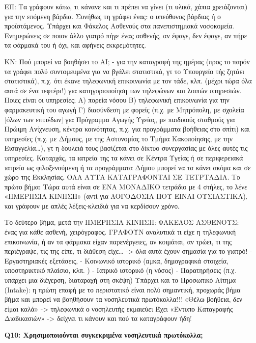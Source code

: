 ΕΠ: Τα γράφουν κάτω, τι κάνανε και τι πρέπει να γίνει (τι υλικά, χάπια χρειάζονται) για την επόμενη βάρδια. Συνήθως τη γράφει ένας: ο υπεύθυνος βάρδιας ή ο προϊστάμενος.
Υπάρχει και Φάκελος Ασθενούς στα πανεπιστημιακά νοσοκομεία.
Ενημερώνεις σε ποιον άλλο γιατρό πήγε ένας ασθενής, αν έφαγε, δεν έφαγε, αν πήρε τα φάρμακά του ή όχι, και αφήνεις εκκρεμότητες.

ΚΝ: Πού μπορεί να βοηθήσει το ΑΙ;
-	για την καταγραφή της ημέρας (προς το παρόν τα γράφει πολύ συντομευμένα για να βγάλει στατιστικά, γτ το Υπουργείο τής ζητάει στατιστικά), π.χ. ότι έκανε τηλεφωνική επικοινωνία με τον τάδε, κλπ. (μέχρι τώρα όλα αυτά σε ένα τεφτέρι!) για κατηγοριοποίηση των τηλεφώνων και λοιπών υπηρεσιών.
Ποιες είναι οι υπηρεσίες;
Α) πορεία νόσου
Β) τηλεφωνική επικοινωνία για την φαρμακευτική του αγωγή 
Γ) διασύνδεση με φορείς (π.χ. με Μητρόπολη, με σχολεία [όλων των επιπέδων] για Πρόγραμμα Αγωγής Υγείας, με παιδικούς σταθμούς για Πρώιμη Ανίχνευση, κέντρα κοινότητας, π.χ. για προγράμματα βοήθειας στο σπίτι) και υπηρεσίες (π.χ. με Δήμους, με της Αστυνομίας το Τμήμα Κακοποίησης, με την Εισαγγελία…), γτ η δουλειά τους βασίζεται στο δίκτυο συνεργασίας με όλες αυτές τις υπηρεσίες. Καταρχάς, τα ιατρεία της τα κάνει σε Κέντρα Υγείας ή σε περιφερειακά ιατρεία ως φιλοξενούμενη ή τα προγράμματα Δήμου μπορεί να τα κάνει ακόμα και σε χώρο της Εκκλησίας. ΟΛΑ ΑΥΤΑ ΚΑΤΑΓΡΑΦΟΝΤΑΙ ΣΕ ΤΕΤΡΤΑΔΙΑ.
Το πρώτο βήμα: Τώρα αυτά είναι σε ΕΝΑ ΜΟΝΑΔΙΚΟ τετράδιο με 4 στήλες, το λένε «ΗΜΕΡΗΣΙΑ ΚΙΝΗΣΗ» (αντί για ΛΟΓΟΔΟΣΙΑ ΠΟΥ ΕΙΝΑΙ ΟΥΣΙΑΣΤΙΚΑ), και γράφουν με απλές λέξεις-κλειδιά για να κερδίσουν χρόνο.

Το δεύτερο βήμα, μετά την ΗΜΕΡΗΣΙΑ ΚΙΝΗΣΗ:
ΦΑΚΕΛΟΣ ΑΣΘΕΝΟΥΣ: ένας για κάθε ασθενή, χειρόγραφος.
ΓΡΑΦΟΥΝ αναλυτικά τι είχε η τηλεφωνική επικοινωνία, ή αν τα φάρμακα είχαν παρενέργειες, αν κοιμάται, αν τρώει, τι της περιέγραψε, τις της είπε, τι διάθεση είχε… -> όλα αυτά έχουν σημασία για το γιατρό!
-	Εργαστηριακές εξετάσεις,
-	Κοινωνικό ιστορικό (αμκα, δημογραφικά στοιχεία, υποστηρικτικό πλαίσιο, κλπ. )
-	Ιατρικό ιστορικό (η νόσος)
-	Παρατηρήσεις (π.χ. υπάρχει μια διέγερση, διαταραχή στη σκέψη)
Υπάρχει και το Προσωπικό Αίτημα (Intake): η πρώτη επαφή με το περιστατικό είναι πολύ σημαντική, προχωράς βήμα βήμα και μπορεί να βοηθήσουν τα νοσηλευτικά πρωτόκολλα!!!
«Θέλω βοήθεια, δεν είμαι καλά» -> τηλεφωνικά ο νοσηλευτής εκμαιεύει
Έχει «Έντυπο Καταγραφής Διαδικασιών» -> δείχνει τι κάνουν και πού τα καταγράφουν ήδη!

\textbf{Q10:	Χρησιμοποιούνται συγκεκριμένα νοσηλευτικά πρωτόκολλα;}

